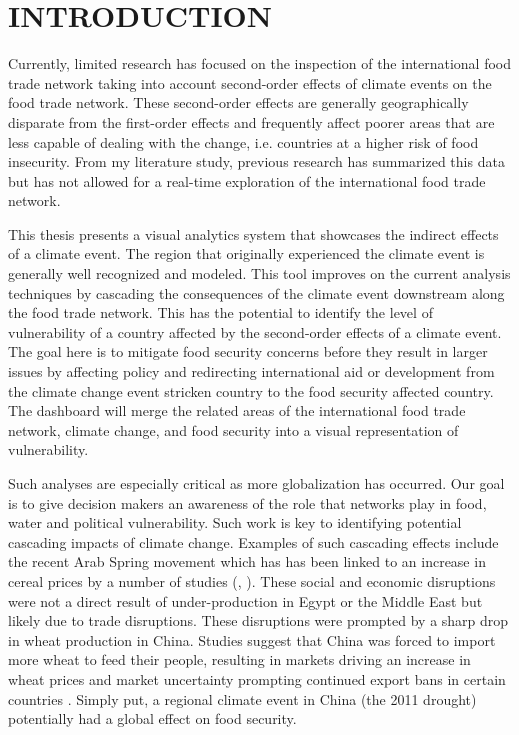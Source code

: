 \chapter{INTRODUCTION}
\label{introChapter}
Currently, limited research has focused on the inspection of the international food trade network taking into account second-order effects of climate events on the food trade network. These second-order effects are generally geographically disparate from the first-order effects and frequently affect poorer areas that are less capable of dealing with the change, i.e. countries at a higher risk of food insecurity. From my literature study, previous research has summarized this data but has not allowed for a real-time exploration of the international food trade network.\par
This thesis presents a visual analytics system that showcases the indirect effects of a climate event. The region that originally experienced the climate event is generally well recognized and modeled. This tool improves on the current analysis techniques by cascading the consequences of the climate event downstream along the food trade network. This has the potential to identify the level of vulnerability of a country affected by the second-order effects of a climate event. The goal here is to mitigate food security concerns before they result in larger issues by affecting policy and redirecting international aid or development from the climate change event stricken country to the food security affected country. The dashboard will merge the related areas of the international food trade network, climate change, and food security into a visual representation of vulnerability.\par
Such analyses are especially critical as more globalization has occurred. Our goal is to give decision makers an awareness of the role that networks play in food, water and political vulnerability. Such work is key to identifying potential cascading impacts of climate change. Examples of such cascading effects include the recent Arab Spring movement which has has been linked to an increase in cereal prices by a number of studies (\cite{johnstone2011global}, \cite{sternberg2012chinese}). These social and economic disruptions were not a direct result of under-production in Egypt or the Middle East but likely due to trade disruptions. These disruptions were prompted by a sharp drop in wheat production in China. Studies suggest that China was forced to import more wheat to feed their people, resulting in markets driving an increase in wheat prices and market uncertainty prompting continued export bans in certain countries \citep{fellmann2014harvest}. Simply put, a regional climate event in China (the 2011 drought) potentially had a global effect on food security.\par
